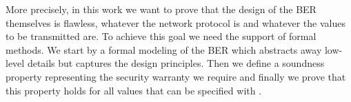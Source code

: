 \medskip

More precisely, in this work we want to prove that the design of the
BER themselves is flawless, whatever the network protocol is and
whatever the values to be transmitted are. To achieve this goal we
need the support of formal methods. We start by a formal modeling of
the BER which abstracts away low-level details but captures the design
principles. Then we define a soundness property representing the
security warranty we require and finally we prove that this property
holds for all values that can be specified with \ASN.


